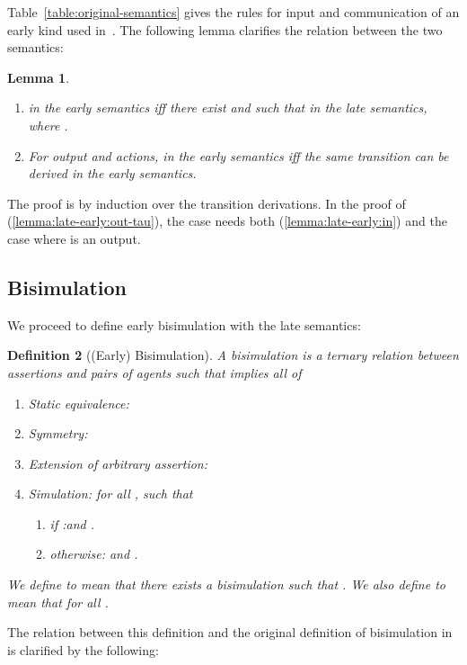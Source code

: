 \documentclass{eptcs}
\newtheorem{definition}{Definition}
\newtheorem{lemma}[definition]{Lemma}
\theoremstyle{definition}
\begin{document}
Table~\ref{table:original-semantics} gives the rules for
input and communication
of an early kind used in~\cite{bengtson.johansson.ea:psi-calculi}.
The following lemma clarifies the relation between the two semantics:
\begin{lemma}
\ 
\label{lemma:late-early}
\begin{enumerate}
\item \label{lemma:late-early:in}
 in the early semantics iff there exist
 and  such that
 in the late semantics,
where .
\item \label{lemma:late-early:out-tau}
For output and  actions,  in the early semantics iff the same transition can be derived in the early semantics.
\end{enumerate}
\end{lemma}
The proof is by induction over the transition derivations. In the proof of (\ref{lemma:late-early:out-tau}), the case  needs both (\ref{lemma:late-early:in}) and the case where  is an output.

\subsection{Bisimulation}
We proceed to define early bisimulation with the late semantics:

\begin{definition}[(Early) Bisimulation]
A {\em bisimulation}
  is a ternary relation between assertions and pairs of agents such that
  implies all of
 \begin{enumerate}
 \item Static equivalence:
  
 \item
   Symmetry: 
 \item
 Extension of arbitrary assertion: 
 \item
  Simulation: for all ,  such that 
\begin{enumerate}
\item if :\quad  and
.
\item otherwise: \quad  and
.
\end{enumerate}
\end{enumerate}
 \label{def:bisim}
We define  to mean that there exists a bisimulation  such
that
. We also define  to mean that
 for all .
\end{definition}

The relation between this definition and the original definition of bisimulation in~\cite{bengtson.johansson.ea:psi-calculi} is clarified by the following:
\end{document}
